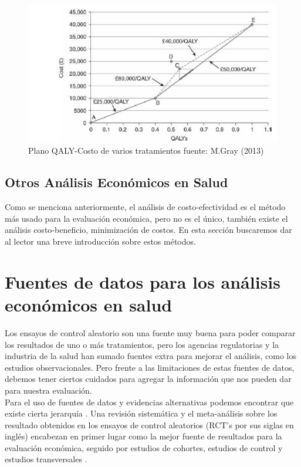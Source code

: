 \documentclass[12pt]{article}
\begin{document}
\begin{figure}[H]
    \centering
    \includegraphics[width=1\textwidth]{grafi/mutuamente_excluyentes_M_Gray.jpg}
    \caption{Plano QALY-Costo de varios tratamientos fuente: M.Gray (2013)}
    \label{fig:2}
\end{figure}



\subsection{Otros Análisis Económicos en Salud}

Como se menciona anteriormente, el análisis de costo-efectividad es el método más usado para la evaluación económica, pero no es el único, también existe el análisis costo-beneficio, minimización de costos. En esta sección buscaremos dar al lector una breve introducción sobre estos métodos.



\section{Fuentes de datos para los análisis económicos en salud}

Los ensayos de control aleatorio son una fuente muy buena para poder comparar los resultados de uno o más tratamientos, pero los agencias regulatorias y la industria de la salud han sumado fuentes extra para mejorar el análisis, como los estudios observacionales. Pero frente a las limitaciones de estas fuentes de datos, debemos tener ciertos cuidados para agregar la información que nos pueden dar para nuestra evaluación. \cite{gray_applied_2011}\\

Para el uso de fuentes de datos y evidencias alternativas podemos encontrar que existe cierta jerarquía .
Una revisión sistemática y el meta-análisis sobre los resultado obtenidos en los ensayos de control aleatorios (RCT's por sus siglas en inglés) encabezan en primer lugar como la mejor fuente de resultados para la evaluación económica, seguido por estudios de cohortes, estudios de control y estudios transversales \cite{alemayehu_statistical_2017}.
\end{document}

